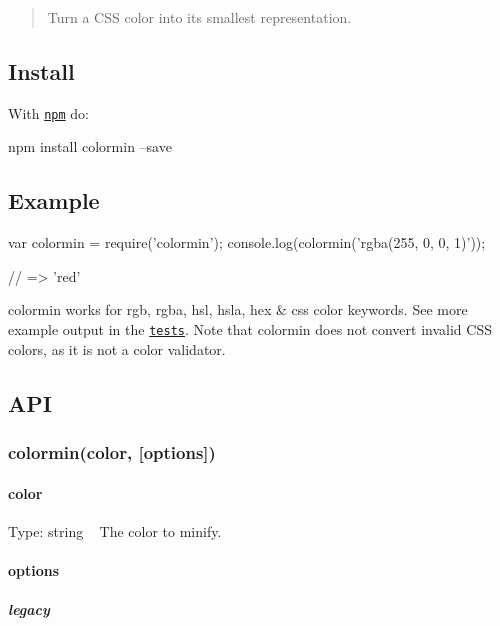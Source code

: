 \begin{quote}
Turn a C\+SS color into its smallest representation. \end{quote}


\subsection*{Install}

With \href{https://npmjs.org/package/colormin}{\tt npm} do\+:


\begin{DoxyCode}
npm install colormin --save
\end{DoxyCode}


\subsection*{Example}


\begin{DoxyCode}
var colormin = require('colormin');
console.log(colormin('rgba(255, 0, 0, 1)'));

// => 'red'
\end{DoxyCode}


colormin works for rgb, rgba, hsl, hsla, hex \& css color keywords. See more example output in the \href{src/__tests__/index.js}{\tt tests}. Note that colormin does not convert invalid C\+SS colors, as it is not a color validator.

\subsection*{A\+PI}

\subsubsection*{colormin(color, \mbox{[}options\mbox{]})}

\paragraph*{color}

Type\+: {\ttfamily string} ~\newline
 The color to minify.

\paragraph*{options}

\subparagraph*{legacy}

